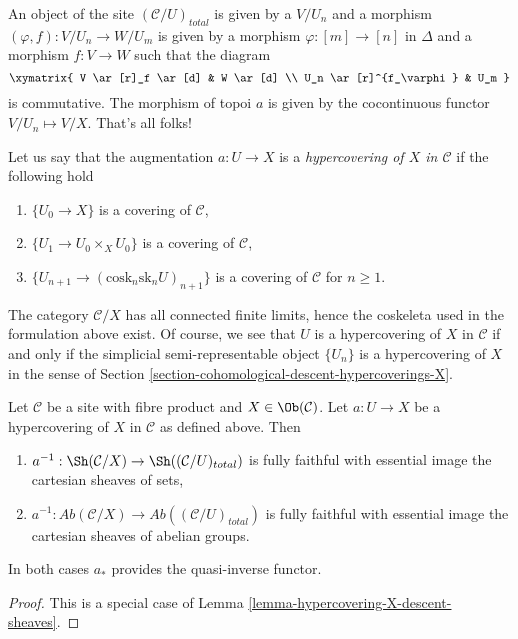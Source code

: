 \medskip\noindent
An object of the site $(\mathcal{C}/U)_{total}$ is given by
a $V/U_n$ and a morphism $(\varphi, f) : V/U_n \to W/U_m$ is given
by a morphism $\varphi : [m] \to [n]$ in $\Delta$ and a morphism
$f : V \to W$ such that the diagram
$$
\xymatrix{
V \ar[r]_f \ar[d] & W \ar[d] \\
U_n \ar[r]^{f_\varphi} & U_m
}
$$
is commutative. The morphism of topoi $a$ is given by the cocontinuous
functor $V/U_n \mapsto V/X$. That's all folks!

\medskip\noindent
Let us say that the augmentation $a : U \to X$ is a
{\it hypercovering of $X$ in $\mathcal{C}$}
if the following hold
\begin{enumerate}
\item $\{U_0 \to X\}$ is a covering of $\mathcal{C}$,
\item $\{U_1 \to U_0 \times_X U_0\}$ is a covering of $\mathcal{C}$,
\item $\{U_{n + 1} \to (\text{cosk}_n\text{sk}_n U)_{n + 1}\}$
is a covering of $\mathcal{C}$ for $n \geq 1$.
\end{enumerate}
The category $\mathcal{C}/X$ has all connected finite limits, hence the
coskeleta used in the formulation above exist. Of course, we see
that $U$ is a hypercovering of $X$ in $\mathcal{C}$ if and only if
the simplicial semi-representable object $\{U_n\}$ is a hypercovering of $X$
in the sense of Section \ref{section-cohomological-descent-hypercoverings-X}.

\begin{lemma}
\label{lemma-hypercovering-X-simple-descent-sheaves}
Let $\mathcal{C}$ be a site with fibre product and $X \in \Ob(\mathcal{C})$.
Let $a : U \to X$ be a hypercovering of $X$ in $\mathcal{C}$ as defined above.
Then
\begin{enumerate}
\item $a^{-1} : \Sh(\mathcal{C}/X) \to \Sh((\mathcal{C}/U)_{total})$
is fully faithful with essential image the cartesian sheaves of sets,
\item $a^{-1} : \textit{Ab}(\mathcal{C}/X) \to
\textit{Ab}((\mathcal{C}/U)_{total})$
is fully faithful with essential image the cartesian sheaves
of abelian groups.
\end{enumerate}
In both cases $a_*$ provides the quasi-inverse functor.
\end{lemma}

\begin{proof}
This is a special case of
Lemma \ref{lemma-hypercovering-X-descent-sheaves}.
\end{proof}

